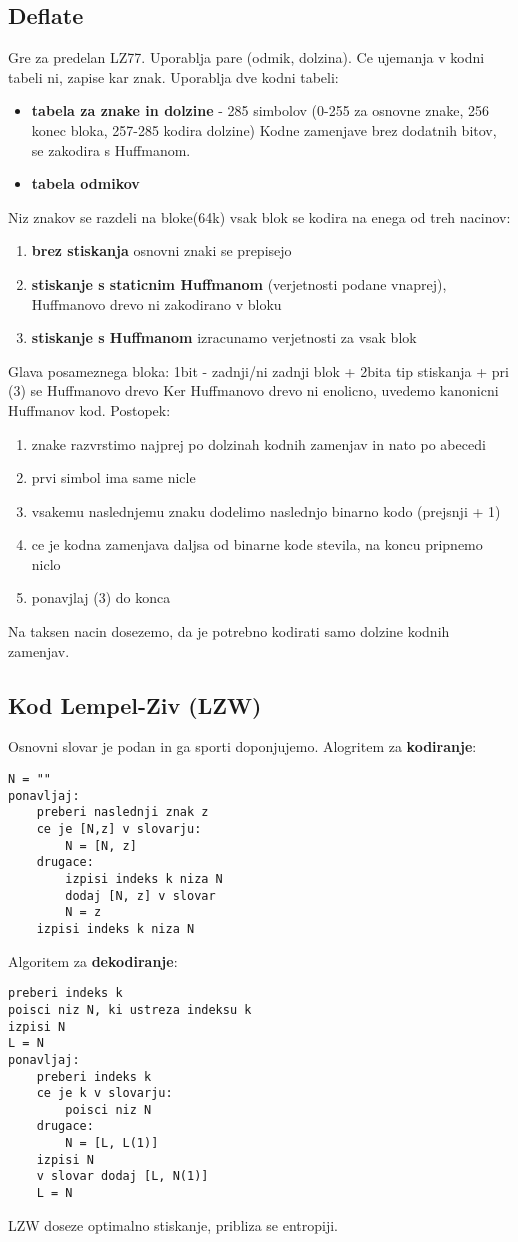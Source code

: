 \documentclass{article}
\begin{document}
\begin{multicols}{3}
\subsection{Deflate}
Gre za predelan LZ77. Uporablja pare (odmik, dolzina). Ce ujemanja v kodni tabeli ni, zapise kar znak.
Uporablja dve kodni tabeli:
\begin{itemize}
    \item \textbf{tabela za znake in dolzine} - 285 simbolov
        (0-255 za osnovne znake, 256 konec bloka, 257-285 kodira dolzine)
        Kodne zamenjave brez dodatnih bitov, se zakodira s Huffmanom.
    \item \textbf{tabela odmikov}
\end{itemize}
Niz znakov se razdeli na bloke(64k)
vsak blok se kodira na enega od treh nacinov:
\begin{enumerate}
    \item \textbf{brez stiskanja} osnovni znaki se prepisejo
    \item \textbf{stiskanje s staticnim Huffmanom} (verjetnosti podane vnaprej), Huffmanovo drevo ni zakodirano v bloku
    \item \textbf{stiskanje s Huffmanom} izracunamo verjetnosti za vsak blok
\end{enumerate}
Glava posameznega bloka: 1bit - zadnji/ni zadnji blok + 2bita tip stiskanja + pri (3) se Huffmanovo drevo
Ker Huffmanovo drevo ni enolicno, uvedemo kanonicni Huffmanov kod. Postopek:
\begin{enumerate}
    \item znake razvrstimo najprej po dolzinah kodnih zamenjav in nato po abecedi
    \item prvi simbol ima same nicle
    \item vsakemu naslednjemu znaku dodelimo naslednjo binarno kodo (prejsnji + 1)
    \item ce je kodna zamenjava daljsa od binarne kode stevila, na koncu pripnemo niclo
    \item ponavjlaj (3) do konca
\end{enumerate}
Na taksen nacin dosezemo, da je potrebno kodirati samo dolzine kodnih zamenjav.

\subsection{Kod Lempel-Ziv (LZW)}
Osnovni slovar je podan in ga sporti doponjujemo. Alogritem za \textbf{kodiranje}:
\begin{verbatim}
N = ""
ponavljaj:
    preberi naslednji znak z
    ce je [N,z] v slovarju:
        N = [N, z]
    drugace:
        izpisi indeks k niza N
        dodaj [N, z] v slovar
        N = z
    izpisi indeks k niza N
\end{verbatim}
Algoritem za \textbf{dekodiranje}:
\begin{verbatim}
preberi indeks k
poisci niz N, ki ustreza indeksu k
izpisi N
L = N
ponavljaj:
    preberi indeks k
    ce je k v slovarju:
        poisci niz N
    drugace:
        N = [L, L(1)]
    izpisi N
    v slovar dodaj [L, N(1)]
    L = N
\end{verbatim}
LZW doseze optimalno stiskanje, pribliza se entropiji. %


\end{multicols}
\end{document}
